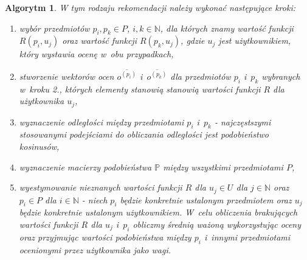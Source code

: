 \documentclass[12pt,a4paper]{report}
\newtheorem{algorytm}[df]{Algorytm}
\newcommand{\setN}{\mathbb{N}}
\newcommand{\setUzytkownicy}{\mathit{U}}
\newcommand{\setPrzedmioty}{\mathit{P}}
\begin{document}
\begin{algorytm}
W tym rodzaju rekomendacji należy wykonać następujące kroki:
\begin{enumerate}
\item wybór przedmiotów $p_i, p_k \in \setPrzedmioty$, $i,k \in \setN$, dla których znamy wartość funkcji $R(p_i,u_j)$ oraz wartość funkcji $R(p_k,u_j)$, gdzie $u_j$ jest użytkownikiem, który wystawia ocenę w~obu przypadkach,
\item stworzenie wektorów ocen $\overline{o^{(p_i)}}$ i~$\overline{o^{(p_k)}}$ dla przedmiotów $p_i$ i~$p_k$ wybranych w~kroku 2., których elementy stanowią stanowią wartości funkcji $R$ dla użytkownika $u_j$,
\item wyznaczenie odległości między przedmiotami $p_i$ i~$p_k$ - najczęstszymi stosowanymi podejściami do obliczania odległości jest podobieństwo kosinusów,
\item wyznaczenie macierzy podobieństwa $\mathbb{P}$ między wszystkimi przedmiotami $\setPrzedmioty$,
\item wyestymowanie nieznanych wartości funkcji $R$ dla $u_j \in \setUzytkownicy$ dla $j \in \setN$ oraz $p_i \in \setPrzedmioty$ dla $i \in \setN$  - niech $p_i$ będzie konkretnie ustalonym przedmiotem oraz $u_j$ będzie konkretnie ustalonym użytkownikiem. W~celu obliczenia brakujących wartości funkcji $R$ dla $u_j$ i~$p_i$ obliczmy średnią ważoną wykorzystując oceny oraz przyjmując wartości podobieństwa między $p_i$ i~innymi przedmiotami ocenionymi przez użytkownika jako wagi.
\end{enumerate}
\end{algorytm}
\end{document}
